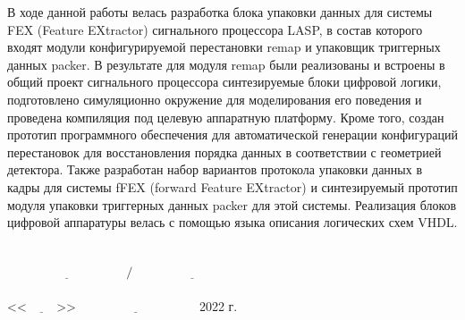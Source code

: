 \documentclass[a4paper, 12pt]{extarticle}
\begin{document}
В ходе данной работы велась разработка блока упаковки данных для системы FEX (Feature EXtractor) сигнального процессора LASP, в состав которого входят модули конфигурируемой перестановки remap и упаковщик триггерных данных packer. В результате для модуля remap были реализованы и встроены в общий проект сигнального процессора синтезируемые блоки цифровой логики, подготовлено симуляционно окружение для моделирования его поведения и проведена компиляция под целевую аппаратную платформу. Кроме того, создан прототип программного обеспечения для автоматической генерации конфигураций перестановок для восстановления порядка данных в соответствии с геометрией детектора. Также разработан набор вариантов протокола упаковки данных в кадры для системы fFEX (forward Feature EXtractor) и синтезируемый прототип модуля упаковки триггерных данных packer для этой системы. Реализация блоков цифровой аппаратуры велась с помощью языка описания логических схем VHDL.
\\~\\~\\
{\setlength{\parindent}{0cm}
$\underline{\hspace{4cm}}\text{/}\underline{\hspace{4cm}}$\\~\\
<<$\underline{\hspace{1cm}}$>>$\underline{\hspace{4cm}}$ 2022 г.\\
}
\end{document}
